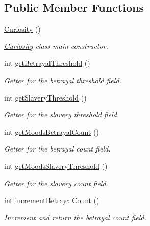 \subsection*{Public Member Functions}
\begin{DoxyCompactItemize}
\item 
\hyperlink{classgameplay_1_1ai_1_1mood_1_1_curiosity_ace7848af7947b88a4b43859a9e00704b}{Curiosity} ()
\begin{DoxyCompactList}\small\item\em \hyperlink{classgameplay_1_1ai_1_1mood_1_1_curiosity}{Curiosity} class main constructor. \end{DoxyCompactList}\item 
int \hyperlink{classgameplay_1_1ai_1_1mood_1_1_mood_a766902de5008b4ff54729075fe0b66a6}{get\-Betrayal\-Threshold} ()
\begin{DoxyCompactList}\small\item\em Getter for the betrayal threshold field. \end{DoxyCompactList}\item 
int \hyperlink{classgameplay_1_1ai_1_1mood_1_1_mood_a8c5dda351cf131a2e2a30a1570e2c7e7}{get\-Slavery\-Threshold} ()
\begin{DoxyCompactList}\small\item\em Getter for the slavery threshold field. \end{DoxyCompactList}\item 
int \hyperlink{classgameplay_1_1ai_1_1mood_1_1_mood_aae8ae123bc9d3bae48e08ad15528aa5b}{get\-Moods\-Betrayal\-Count} ()
\begin{DoxyCompactList}\small\item\em Getter for the betrayal count field. \end{DoxyCompactList}\item 
int \hyperlink{classgameplay_1_1ai_1_1mood_1_1_mood_a859eb2f9bae00ce3604d0fea5a690900}{get\-Moods\-Slavery\-Threshold} ()
\begin{DoxyCompactList}\small\item\em Getter for the slavery count field. \end{DoxyCompactList}\item 
int \hyperlink{classgameplay_1_1ai_1_1mood_1_1_mood_a322adb08d4a6f7dcd0eb00c77649d2d2}{increment\-Betrayal\-Count} ()
\begin{DoxyCompactList}\small\item\em Increment and return the betrayal count field. \end{DoxyCompactList}\item 

\end{DoxyCompactItemize}
